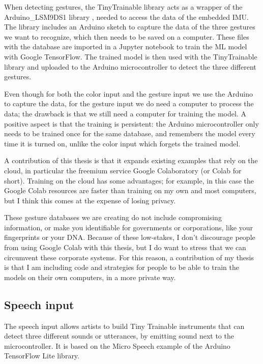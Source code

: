 When detecting gestures, the TinyTrainable library acts as a wrapper of the Arduino{\_}LSM9DS1 library \cite{repository-arduino-LSM9DS1} , needed to access the data of the embedded \acrfull{IMU}. The library includes an Arduino sketch to capture the data of the three gestures we want to recognize, which then needs to be saved on a computer. These files with the database are imported in a Jupyter notebook to train the \acrshort{ML} model with Google TensorFlow. The trained model is then used with the TinyTrainable library and uploaded to the Arduino microcontroller to detect the three different gestures.

Even though for both the color input and the gesture input we use the Arduino to capture the data, for the gesture input we do need a computer to process the data; the drawback is that we still need a computer for training the model. A positive aspect is that the training is persistent: the Arduino microcontroller only needs to be trained once for the same database, and remembers the model every time it is turned on, unlike the color input which forgets the trained model.

A contribution of this thesis is that it expands existing examples that rely on the cloud, in particular the freemium service Google Colaboratory \cite{website-google-colab} (or Colab for short). Training on the cloud has some advantages; for example, in this case the Google Colab resources are faster than training on my own and most computers, but I think this comes at the expense of losing privacy.

These gesture databases we are creating do not include compromising information, or make you identifiable for governments or corporations, like your fingerprints or your DNA. Because of these low-stakes, I don't discourage people from using Google Colab with this thesis, but I do want to stress that we can circumvent these corporate systems. For this reason, a contribution of my thesis is that I am including code and strategies for people to be able to train the models on their own computers, in a more private way.

\subsection{Speech input}

The speech input allows artists to build Tiny Trainable instruments that can detect three different sounds or utterances, by emitting sound next to the microcontroller.  It is based on the Micro Speech example of the Arduino TensorFlow Lite library.

